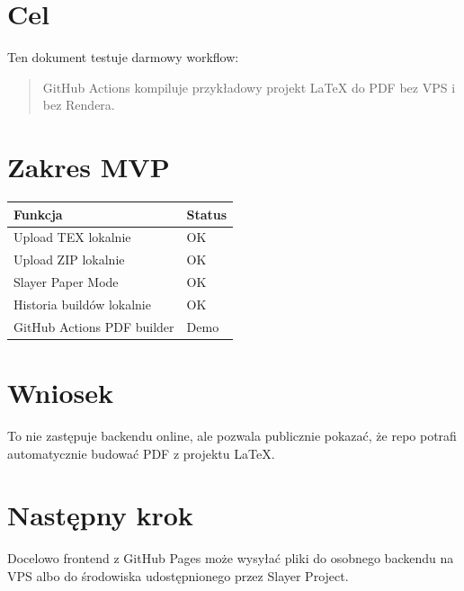 \section{Cel}

Ten dokument testuje darmowy workflow:

\begin{quote}
GitHub Actions kompiluje przykładowy projekt LaTeX do PDF bez VPS i bez Rendera.
\end{quote}

\section{Zakres MVP}

\begin{center}
\begin{tabular}{ll}
\toprule
Funkcja & Status \\
\midrule
Upload TEX lokalnie & OK \\
Upload ZIP lokalnie & OK \\
Slayer Paper Mode & OK \\
Historia buildów lokalnie & OK \\
GitHub Actions PDF builder & Demo \\
\bottomrule
\end{tabular}
\end{center}

\section{Wniosek}

To nie zastępuje backendu online, ale pozwala publicznie pokazać, że repo potrafi automatycznie budować PDF z projektu LaTeX.

\section{Następny krok}

Docelowo frontend z GitHub Pages może wysyłać pliki do osobnego backendu na VPS albo do środowiska udostępnionego przez Slayer Project.
